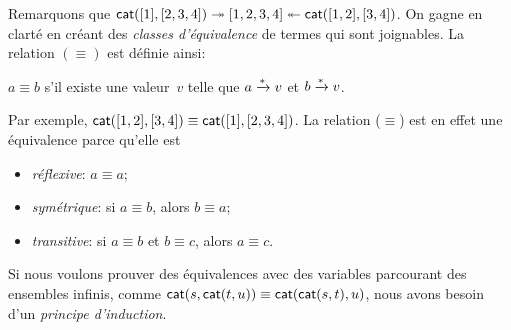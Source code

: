 Remarquons que \(\textsf{cat}([1], [2,3,4]) \twoheadrightarrow [1,2,3,4]
\twoheadleftarrow \textsf{cat}([1,2],
[3,4])\). On gagne en clarté en créant des
\emph{classes d'équivalence} de termes qui sont joignables. La
relation \((\equiv)\) est définie ainsi:
\begin{center}
  \(a \equiv b\) s'il existe une valeur~\(v\) telle que \(a
  \xrightarrow{\smash[t]{*}} v\) et \(b \xrightarrow{\smash{*}} v\).
\end{center}
Par exemple, \(\textsf{cat}([1,2], [3,4]) \equiv \textsf{cat}([1],
[2,3,4])\). La relation (\(\equiv\)) est en effet une équivalence
parce qu'elle est
\begin{itemize}

  \item \emph{réflexive}: \(a \equiv a\);

  \item \emph{symétrique}: si \(a \equiv b\), alors \(b \equiv a\);

  \item \emph{transitive}: si \(a \equiv b\) et \(b \equiv c\), alors
    \(a \equiv c\).

\end{itemize}

Si nous voulons prouver des équivalences avec des variables
parcourant des ensembles infinis, comme \(\textsf{cat}(s,\textsf{cat}(t,u))
\equiv \textsf{cat}(\textsf{cat}(s,t),u)\), nous
avons besoin d'un \emph{principe d'induction}.

\label{par:well-founded}

